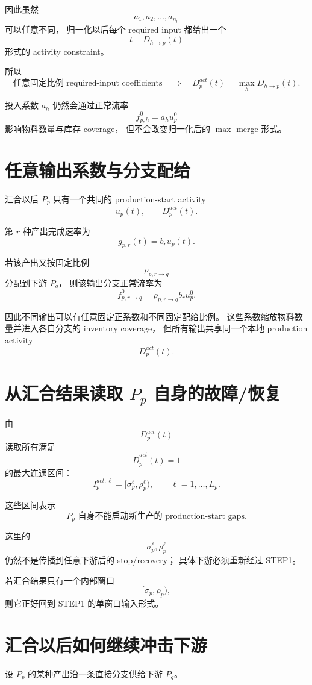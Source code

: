 \documentclass[UTF8,11pt]{ctexart}
\begin{document}
因此虽然
\[
a_1,a_2,\ldots,a_{n_p}
\]
可以任意不同，
归一化以后每个 required input 都给出一个
\[
t-D_{h\to p}(t)
\]
形式的 activity constraint。

所以
\[
\boxed{
\text{任意固定比例 required-input coefficients}
\quad\Longrightarrow\quad
D_p^{act}(t)=\max_hD_{h\to p}(t).
}
\tag{15}
\]

投入系数 \(a_h\) 仍然会通过正常流率
\[
f_{p,h}^0=a_hu_p^0
\]
影响物料数量与库存 coverage，
但不会改变归一化后的 \(\max\) merge 形式。

\section{任意输出系数与分支配给}

汇合以后 \(P_p\) 只有一个共同的 production-start activity
\[
u_p(t),
\qquad
D_p^{act}(t).
\]

第 \(r\) 种产出完成速率为
\[
g_{p,r}(t)=b_ru_p(t).
\]

若该产出又按固定比例
\[
\rho_{p,r\to q}
\]
分配到下游 \(P_q\)，
则该输出分支正常流率为
\[
\boxed{
f_{p,r\to q}^0
=
\rho_{p,r\to q}b_ru_p^0.
}
\tag{16}
\]

因此不同输出可以有任意固定正系数和不同固定配给比例。
这些系数缩放物料数量并进入各自分支的 inventory coverage，
但所有输出共享同一个本地 production activity
\[
D_p^{act}(t).
\]

\section{从汇合结果读取 \(P_p\) 自身的故障/恢复}

由
\[
D_p^{act}(t)
\]
读取所有满足
\[
\dot D_p^{act}(t)=1
\]
的最大连通区间：
\[
\boxed{
I_p^{act,\ell}
=
[\sigma_p^\ell,\rho_p^\ell),
\qquad
\ell=1,\ldots,L_p.
}
\tag{17}
\]

这些区间表示
\[
\boxed{
\text{\(P_p\) 自身不能启动新生产的 production-start gaps}.
}
\]

这里的
\[
\sigma_p^\ell,\rho_p^\ell
\]
仍然不是传播到任意下游后的 stop/recovery；
具体下游必须重新经过 STEP1。

若汇合结果只有一个内部窗口
\[
[\sigma_p,\rho_p),
\]
则它正好回到 STEP1 的单窗口输入形式。

\section{汇合以后如何继续冲击下游}

设 \(P_p\) 的某种产出沿一条直接分支供给下游 \(P_q\)。
\end{document}
